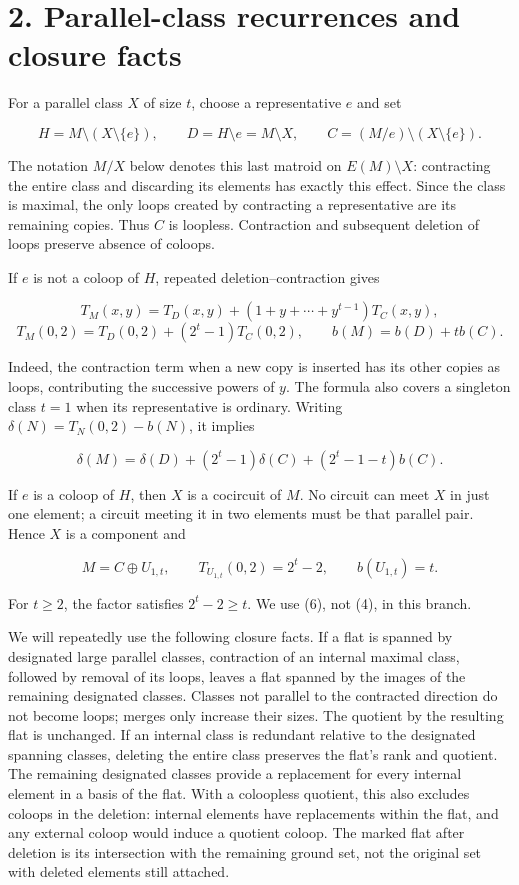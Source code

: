 \documentclass[11pt]{article}
\begin{document}
\section*{2. Parallel-class recurrences and closure facts}

For a parallel class \(X\) of size \(t\), choose a representative \(e\) and set

\[
H=M\setminus(X\setminus\{e\}),\qquad D=H\setminus e=M\setminus X,
\qquad C=(M/e)\setminus(X\setminus\{e\}). \tag{3}
\]

The notation \(M/X\) below denotes this last matroid on \(E(M)\setminus X\): contracting the entire class and discarding its elements has exactly this effect. Since the class is maximal, the only loops created by contracting a representative are its remaining copies. Thus \(C\) is loopless. Contraction and subsequent deletion of loops preserve absence of coloops.

If \(e\) is not a coloop of \(H\), repeated deletion--contraction gives

\[
T_M(x,y)=T_D(x,y)+(1+y+\cdots+y^{t-1})T_C(x,y),
\]
\[
T_M(0,2)=T_D(0,2)+(2^t-1)T_C(0,2),
\qquad b(M)=b(D)+t b(C). \tag{4}
\]

Indeed, the contraction term when a new copy is inserted has its other copies as loops, contributing the successive powers of \(y\). The formula also covers a singleton class \(t=1\) when its representative is ordinary. Writing \(\delta(N)=T_N(0,2)-b(N)\), it implies

\[
\delta(M)=\delta(D)+(2^t-1)\delta(C)+(2^t-1-t)b(C). \tag{5}
\]

If \(e\) is a coloop of \(H\), then \(X\) is a cocircuit of \(M\). No circuit can meet \(X\) in just one element; a circuit meeting it in two elements must be that parallel pair. Hence \(X\) is a component and

\[
M=C\oplus U_{1,t},\qquad T_{U_{1,t}}(0,2)=2^t-2,
\qquad b(U_{1,t})=t. \tag{6}
\]

For \(t\ge2\), the factor satisfies \(2^t-2\ge t\). We use (6), not (4), in this branch.

We will repeatedly use the following closure facts. If a flat is spanned by designated large parallel classes, contraction of an internal maximal class, followed by removal of its loops, leaves a flat spanned by the images of the remaining designated classes. Classes not parallel to the contracted direction do not become loops; merges only increase their sizes. The quotient by the resulting flat is unchanged. If an internal class is redundant relative to the designated spanning classes, deleting the entire class preserves the flat's rank and quotient. The remaining designated classes provide a replacement for every internal element in a basis of the flat. With a coloopless quotient, this also excludes coloops in the deletion: internal elements have replacements within the flat, and any external coloop would induce a quotient coloop. The marked flat after deletion is its intersection with the remaining ground set, not the original set with deleted elements still attached.
\end{document}
